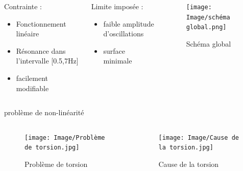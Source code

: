 \documentclass{beamer}
\begin{document}
\begin{frame}
	\begin{columns}
		\begin{column}{0.3\textwidth}
			
		
	
	Contrainte : 
	\begin{itemize}
		\item Fonctionnement linéaire 
		\item Résonance dans l'intervalle [0.5,7Hz]
		\item facilement modifiable
	\end{itemize}
\end{column}
\begin{column}{0.3\textwidth}
	Limite imposée : 
	\begin{itemize}
		\item faible amplitude d'oscillations
		\item surface minimale
	\end{itemize}

\end{column}
\begin{column}{0.3\textwidth}
	\begin{figure}
		\texttt{[image: Image/schéma global.png]}
		\caption{Schéma global}
	\end{figure}
\end{column}
\end{columns}
\end{frame}
\begin{frame}{problème de non-linéarité}
	\begin{columns}
		\begin{column}{0.35\textwidth}
			\begin{figure}
				
			
			\texttt{[image: Image/Problème de torsion.jpg]}
			\caption{Problème de torsion}
		\end{figure}
		\end{column}
		\begin{column}{0.35\textwidth}
			\begin{figure}
				\texttt{[image: Image/Cause de la torsion.jpg]}
				\caption{Cause de la torsion}
			\end{figure}
		\end{column}
	\end{columns}
\end{frame}
\end{document}
